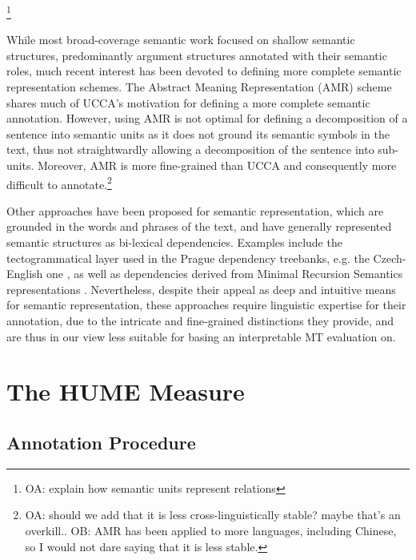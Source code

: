 \documentclass[11pt]{article}
\newcommand{\oa}[1]{\footnote{\color{red}OA: #1}}
\def\parcite#1{\cite{#1}}
\begin{document}
\oa{explain how semantic units represent relations}

While most broad-coverage semantic work focused on shallow semantic structures,
predominantly argument structures annotated with their semantic roles, much recent
interest has been devoted to defining more complete semantic representation schemes.
The Abstract Meaning Representation (AMR) scheme \cite{banarescu2013abstract}
shares much of UCCA's motivation for defining a more complete semantic annotation.
However, using AMR is not optimal for defining a decomposition of a sentence into semantic
units as it does not ground its semantic symbols in the text,
thus not straightwardly allowing a decomposition of the sentence into sub-units.
Moreover, AMR is more fine-grained than UCCA and consequently more difficult to annotate.\oa{should we
  add that it is less cross-linguistically stable? maybe that's an overkill..
  OB: AMR has been applied to more languages, including Chinese, so I would not
  dare saying that it is less stable.}

Other approaches have been proposed for semantic representation, which are grounded in the words
and phrases of the text, and have generally represented semantic structures as bi-lexical dependencies.
Examples include the tectogrammatical layer \parcite{sgallhp:1986} used in the Prague dependency
treebanks, e.g. the Czech-English one \parcite{hajic2012announcing}, as well
as dependencies derived from Minimal Recursion Semantics representations \parcite{oepen2006discriminant}.
Nevertheless, despite their appeal as deep and intuitive means for semantic representation,
these approaches require linguistic expertise for their annotation, due to the intricate and
fine-grained distinctions they provide, and are thus in our view less suitable for basing
an interpretable MT evaluation on. 


\section{The HUME Measure}\label{sec:hume}


\subsection{Annotation Procedure}\label{sec:guidelines}
\end{document}
